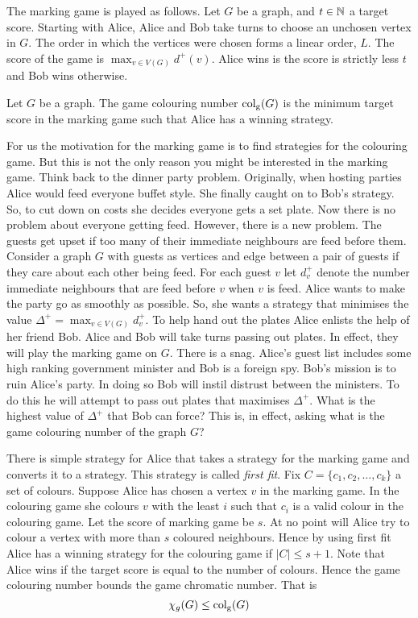 The marking game is played as follows. Let $G$ be a graph, and $t\in\mathbb{N}$ a target score. Starting with Alice, Alice and Bob take turns to choose an unchosen vertex in $G$. The order in which the vertices were chosen forms a linear order, $L$. The score of the game is $\max_{v\in V(G)}d^+(v)$. Alice wins is the score is strictly less $t$ and Bob wins otherwise. 
%
\begin{definition}
    Let $G$ be a graph. The game colouring number $\operatorname{col_g}(G)$ is the minimum target score in the marking game such that Alice has a winning strategy. 
\end{definition}
%

For us the motivation for the marking game is to find strategies for the colouring game. But this is not the only reason you might be interested in the marking game. Think back to the dinner party problem. Originally, when hosting parties Alice would feed everyone buffet style. She finally caught on to Bob's strategy. So, to cut down on costs she decides everyone gets a set plate. Now there is no problem about everyone getting feed. However, there is a new problem. The guests get upset if too many of their immediate neighbours are feed before them. Consider a graph $G$ with guests as vertices and edge between a pair of guests if they care about each other being feed. For each guest $v$ let $d^+_v$ denote the number immediate neighbours that are feed before $v$ when $v$ is feed. Alice wants to make the party go as smoothly as possible. So, she wants a strategy that minimises the value $\Delta^+=\max_{v\in V(G)} d^+_v$.
To help hand out the plates Alice enlists the help of her friend Bob. Alice and Bob will take turns passing out plates. In effect, they will play the marking game on $G$. There is a snag. Alice's guest list includes some high ranking government minister and Bob is a foreign spy. Bob's mission is to ruin Alice's party. In doing so Bob will instil distrust between the ministers. To do this he will attempt to pass out plates that maximises $\Delta^+$. What is the highest value of $\Delta^+$ that Bob can force? This is, in effect, asking what is the game colouring number of the graph $G$?

There is simple strategy for Alice that takes a strategy for the marking game and converts it to a strategy. This strategy is called \textit{first fit}. Fix $C=\{c_1,c_2,\dots,c_k\}$ a set of colours. Suppose Alice has chosen a vertex $v$ in the marking game. In the colouring game she colours $v$ with the least $i$ such that $c_i$ is a valid colour in the colouring game. Let the score of marking game be $s$. At no point will Alice try to colour a vertex with more than $s$ coloured neighbours. Hence by using first fit Alice has a winning strategy for the colouring game if $|C|\leq s+1$. Note that Alice wins if the target score is equal to the number of colours. Hence the game colouring number bounds the game chromatic number. That is \[\chi_g(G)\leq\operatorname{col_g}(G)\]

